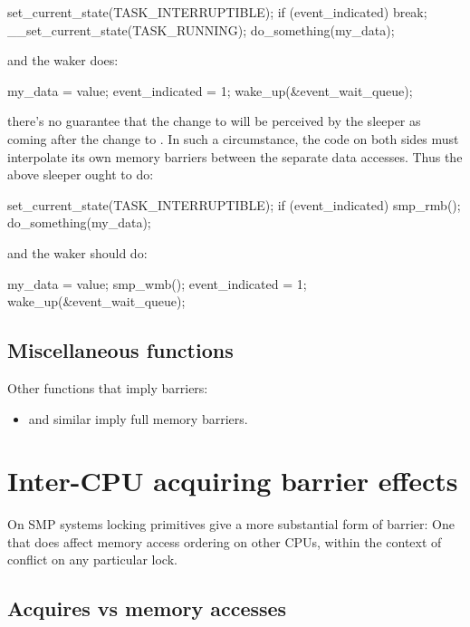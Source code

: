 \begin{VerbatimU}
	set_current_state(TASK_INTERRUPTIBLE);
	if (event_indicated)
		break;
	__set_current_state(TASK_RUNNING);
	do_something(my_data);
\end{VerbatimU}

and the waker does:

\begin{VerbatimU}
	my_data = value;
	event_indicated = 1;
	wake_up(&event_wait_queue);
\end{VerbatimU}

there's no guarantee that the change to  will be
perceived by the sleeper as coming after the change to .
In such a circumstance, the code on both sides must interpolate its own
memory barriers between the separate data accesses.
Thus the above sleeper ought to do:

\begin{VerbatimU}
	set_current_state(TASK_INTERRUPTIBLE);
	if (event_indicated) {
		smp_rmb();
		do_something(my_data);
	}
\end{VerbatimU}

and the waker should do:

\begin{VerbatimU}
	my_data = value;
	smp_wmb();
	event_indicated = 1;
	wake_up(&event_wait_queue);
\end{VerbatimU}

\subsection{Miscellaneous functions}

Other functions that imply barriers:

\begin{itemize}
 \item {} and similar imply full memory barriers.
\end{itemize}


\section{Inter-CPU acquiring barrier effects}
\label{sec:Inter-CPU acquiring barrier effects}

On SMP systems locking primitives give a more substantial form of barrier:
One that does affect memory access ordering on other CPUs, within the
context of conflict on any particular lock.


\subsection{Acquires vs memory accesses}

